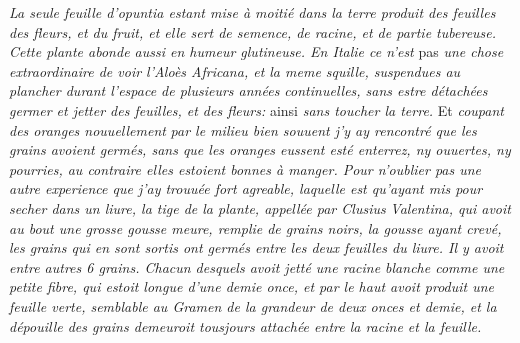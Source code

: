 {}
%
%
% 
\textit{La seule feuille d'opuntia\protect{}
estant mise \`{a} moiti\'{e} dans la terre produit des feuilles des fleurs, et du fruit,
et elle sert de semence, de racine, et de partie tubereuse.
Cette plante abonde aussi en humeur glutineuse.
En Italie\protect{} ce n'est} pas \textit{une chose extraordinaire
de voir l'Alo\`{e}s Africana,\protect{}
et la meme squille, suspendues au plancher durant l'espace de plusieurs ann\'{e}es continuelles,
sans estre d\'{e}tach\'{e}es germer et jetter des feuilles, et des fleurs:}
ainsi \textit{sans toucher la terre.}
Et%
\textit{coupant des oranges\protect{} nouuellement}
\textit{par le milieu bien souuent j'y ay rencontr\'{e} que les grains avoient germ\'{e}s,
sans que les oranges\protect{} eussent est\'{e} enterrez,
ny ouuertes, ny pourries, au contraire elles estoient bonnes \`{a} manger.
Pour n'oublier pas une autre experience que j'ay trouu\'{e}e fort agreable,
laquelle est qu'ayant mis pour secher dans un liure, la tige de la plante,
appell\'{e}e par Clusius\protect{}}
\textit{Valentina\protect{}, qui avoit au bout une grosse gousse meure,
remplie de grains noirs, la gousse ayant crev\'{e}, les grains qui en sont sortis ont germ\'{e}s entre les deux feuilles du liure.
Il y avoit entre autres 6 grains.
Chacun desquels avoit jett\'{e} une racine blanche comme une petite fibre, qui estoit longue d'une demie once,
et par le haut avoit produit une feuille verte, semblable au Gramen de la grandeur de deux onces et demie,
et la d\'{e}pouille des grains demeuroit tousjours attach\'{e}e entre la racine et la feuille.}%
%
\pend%
